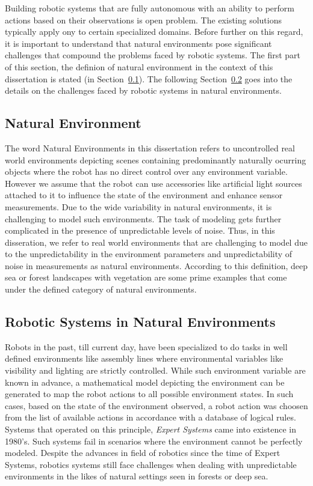 \documentclass {udthesis}
\begin{document}
Building robotic systems that are fully autonomous with an ability to perform actions based on their observations is open problem.
The existing solutions typically apply ony to certain specialized domains. Before further on this regard, it is important to
understand that natural environments pose significant challenges that compound the problems faced by robotic systems.
The first part of this section, the definion of natural environment in the context of this dissertation is stated (in Section~\ref{sec:nat_environ_def}).
The following Section~\ref{sec:robots_nat_environ} goes into the details on the challenges faced by robotic systems in natural environments.


\subsection{Natural Environment}
\label{sec:nat_environ_def}

The word Natural Environments in this dissertation refers to uncontrolled real world  environments depicting scenes containing
predominantly naturally ocurring objects where the robot has 
no direct control over any environment variable. However we assume that the robot can use accessories like artificial light sources attached 
to it to influence the state of the environment and enhance sensor measurements. Due to the wide variability in natural environments, 
it is challenging to model such environments.
The task of modeling gets further complicated in the presence of unpredictable levels of noise. Thus, in this disseration, we refer to real world
environments that are challenging to model due to the unpredictability in the environment parameters and unpredictability of noise in measurements as natural environments. 
According to this definition, deep sea or forest landscapes with vegetation are some prime examples that come under the defined category of natural environments.


\subsection{Robotic Systems in Natural Environments}
\label{sec:robots_nat_environ}

Robots in the past, till current day, have been specialized to do tasks in well defined environments like assembly lines where environmental variables like visibility and lighting are strictly controlled. While such environment variable are known in advance, a mathematical model depicting the environment 
can be generated to map the robot actions to all possible environment states. In such cases, based on the state of the environment observed, a robot action was choosen from the list of available actions in accordance with a database of logical rules. Systems that operated on this principle, \emph{Expert Systems} 
\cite{russel} came into existence in 1980's. Such systems fail in scenarios where the environment cannot be perfectly modeled. Despite the advances in field of robotics since the time of Expert Systems, robotics systems still face challenges when dealing with unpredictable environments in the likes of natural settings seen in forests or deep sea.
\end{document}
